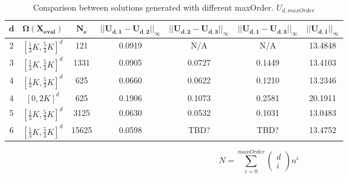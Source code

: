 \documentclass[a4paper]{article}      %
\begin{document}
\begin{table}[H]
  \caption{Comparison between solutions generated with different maxOrder. $U_{d,maxOrder}$}
  \label{tab:rand_reverse}
  \centering
  \begin{tabular}{ccccccc}
     \toprule
	 $\mathbf{d}$ & $\mathbf{\Omega(X_{eval})}$ & $\mathbf{N_e}$ & $\mathbf{||U_{d,1} - U_{d,2}||_\infty}$&$\mathbf{||U_{d,2} - U_{d,3}||_\infty}$ & $\mathbf{||U_{d,1} - U_{d,3}||_\infty}$ & $\mathbf{||U_{d,1}||_\infty}$ \\
	 \midrule
     2 & $[ \frac{1}{3}K,\frac{5}{3}K ]^d $ & 121 & 0.0919 & N/A & N/A & 13.4848 \\
     3& $[ \frac{1}{3}K,\frac{5}{3}K ]^d $ &1331 & 0.0905 & 0.0727 & 0.1449 &  13.4103 \\
     4 & $[ \frac{1}{3}K,\frac{5}{3}K ]^d $ &625 & 0.0660 & 0.0622 & 0.1210 & 13.2346\\
     4 & $[ 0,2K ]^d $  &625 & 0.1906 & 0.1073 & 0.2581  &  20.1911\\
     5& $[ \frac{1}{3}K,\frac{5}{3}K ]^d $ &3125 & 0.0630 & 0.0532 & 0.1031&  13.0483\\
     6& $[ \frac{1}{3}K,\frac{5}{3}K ]^d $ &15625 & 0.0598 & TBD? & TBD?&  13.4752
\\

    \bottomrule
  \end{tabular}
\end{table}

\begin{equation}
N = \sum_{i=0}^{maxOrder} \begin{pmatrix} d \\ i \end{pmatrix} n^i
\end{equation}
\end{document}
